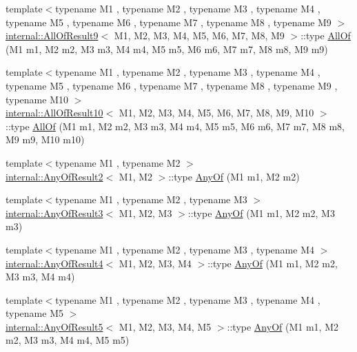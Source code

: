 \begin{DoxyCompactItemize}
\item 
{\footnotesize template$<$typename M1 , typename M2 , typename M3 , typename M4 , typename M5 , typename M6 , typename M7 , typename M8 , typename M9 $>$ }\\\mbox{\hyperlink{structtesting_1_1internal_1_1AllOfResult9}{internal\+::\+All\+Of\+Result9}}$<$ M1, M2, M3, M4, M5, M6, M7, M8, M9 $>$\+::type \mbox{\hyperlink{namespacetesting_aaecf2bd8eb7c68b119f9b81a01942b7f}{All\+Of}} (M1 m1, M2 m2, M3 m3, M4 m4, M5 m5, M6 m6, M7 m7, M8 m8, M9 m9)
\item 
{\footnotesize template$<$typename M1 , typename M2 , typename M3 , typename M4 , typename M5 , typename M6 , typename M7 , typename M8 , typename M9 , typename M10 $>$ }\\\mbox{\hyperlink{structtesting_1_1internal_1_1AllOfResult10}{internal\+::\+All\+Of\+Result10}}$<$ M1, M2, M3, M4, M5, M6, M7, M8, M9, M10 $>$\+::type \mbox{\hyperlink{namespacetesting_a9939c08664efeed0c1983090115f7ecb}{All\+Of}} (M1 m1, M2 m2, M3 m3, M4 m4, M5 m5, M6 m6, M7 m7, M8 m8, M9 m9, M10 m10)
\item 
{\footnotesize template$<$typename M1 , typename M2 $>$ }\\\mbox{\hyperlink{structtesting_1_1internal_1_1AnyOfResult2}{internal\+::\+Any\+Of\+Result2}}$<$ M1, M2 $>$\+::type \mbox{\hyperlink{namespacetesting_a81cfefd9f75cdce827d5bc873cf73aac}{Any\+Of}} (M1 m1, M2 m2)
\item 
{\footnotesize template$<$typename M1 , typename M2 , typename M3 $>$ }\\\mbox{\hyperlink{structtesting_1_1internal_1_1AnyOfResult3}{internal\+::\+Any\+Of\+Result3}}$<$ M1, M2, M3 $>$\+::type \mbox{\hyperlink{namespacetesting_a3ccbde3ba01189587676d44a4333c0a5}{Any\+Of}} (M1 m1, M2 m2, M3 m3)
\item 
{\footnotesize template$<$typename M1 , typename M2 , typename M3 , typename M4 $>$ }\\\mbox{\hyperlink{structtesting_1_1internal_1_1AnyOfResult4}{internal\+::\+Any\+Of\+Result4}}$<$ M1, M2, M3, M4 $>$\+::type \mbox{\hyperlink{namespacetesting_a1cfcacf2cf19543b86445e3585d5356f}{Any\+Of}} (M1 m1, M2 m2, M3 m3, M4 m4)
\item 
{\footnotesize template$<$typename M1 , typename M2 , typename M3 , typename M4 , typename M5 $>$ }\\\mbox{\hyperlink{structtesting_1_1internal_1_1AnyOfResult5}{internal\+::\+Any\+Of\+Result5}}$<$ M1, M2, M3, M4, M5 $>$\+::type \mbox{\hyperlink{namespacetesting_a049ea436e52c242adc44b2b42dc03e50}{Any\+Of}} (M1 m1, M2 m2, M3 m3, M4 m4, M5 m5)

\end{DoxyCompactItemize}
